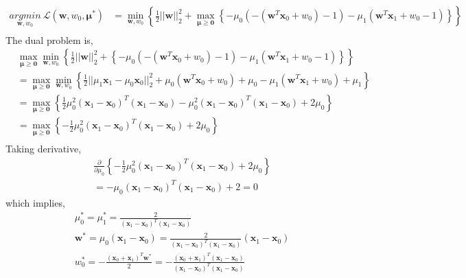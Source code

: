 \documentclass[11pt]{article}
\begin{document}
\begin{equation}
\begin{split}
\underset{\pmb{w},w_0}{argmin}\ \mathcal{L}(\pmb{w},w_0,\pmb{\mu}^*) &= \min_{\pmb{w}, w_0} \left\{\frac{1}{2}||\pmb{w}||^2_2 + \max_{\pmb{\mu}\ge\pmb{0}}\left\{- \mu_0(-(\pmb{w}^T\pmb{x}_0+w_0)-1) - \mu_1(\pmb{w}^T\pmb{x}_1+w_0-1)\right\}\right\}\\
\end{split}
\end{equation} 
The dual problem is,
\begin{equation}
\begin{split}
&\max_{\pmb{\mu}\ge\pmb{0}}\min_{\pmb{w}, w_0} \left\{\frac{1}{2}||\pmb{w}||^2_2 +\left\{- \mu_0(-(\pmb{w}^T\pmb{x}_0+w_0)-1) - \mu_1(\pmb{w}^T\pmb{x}_1+w_0-1)\right\}\right\}\\
&=\max_{\pmb{\mu}\ge\pmb{0}}\min_{\pmb{w}, w_0} \left\{\frac{1}{2}||\mu_1\pmb{x}_1-\mu_0\pmb{x}_0||^2_2+\mu_0(\pmb{w}^T\pmb{x}_0+w_0)+\mu_0 - \mu_1(\pmb{w}^T\pmb{x}_1+w_0)+\mu_1\right\}\\
&=\max_{\pmb{\mu}\ge\pmb{0}} \left\{\frac{1}{2}\mu_0^2(\pmb{x}_1-\pmb{x}_0)^T(\pmb{x}_1-\pmb{x}_0)-\mu_0^2(\pmb{x}_1-\pmb{x}_0)^T(\pmb{x}_1-\pmb{x}_0)+2\mu_0 \right\}\\
&=\max_{\pmb{\mu}\ge\pmb{0}} \left\{-\frac{1}{2}\mu_0^2(\pmb{x}_1-\pmb{x}_0)^T(\pmb{x}_1-\pmb{x}_0)+2\mu_0 \right\}\\
\end{split}
\end{equation}
Taking derivative,
\begin{equation}
\begin{split}
&\frac{\partial }{\partial \mu_0}\left\{-\frac{1}{2}\mu_0^2(\pmb{x}_1-\pmb{x}_0)^T(\pmb{x}_1-\pmb{x}_0)+2\mu_0 \right\}\\
&=-\mu_0(\pmb{x}_1-\pmb{x}_0)^T(\pmb{x}_1-\pmb{x}_0)+2 = 0 
\end{split}
\end{equation}
which implies,
\begin{equation}
\begin{split}
&\mu_0^* = \mu_1^* = \frac{2}{(\pmb{x}_1-\pmb{x}_0)^T(\pmb{x}_1-\pmb{x}_0)}\\
&\pmb{w}^* = \mu_0(\pmb{x}_1-\pmb{x}_0) = \frac{2}{(\pmb{x}_1-\pmb{x}_0)^T(\pmb{x}_1-\pmb{x}_0)} (\pmb{x}_1-\pmb{x}_0)\\
&w_0^* = -\frac{(\pmb{x}_0 + \pmb{x}_1)^T\pmb{w}^*}{2} = -\frac{(\pmb{x}_0 + \pmb{x}_1)^T(\pmb{x}_1-\pmb{x}_0)}{(\pmb{x}_1-\pmb{x}_0)^T(\pmb{x}_1-\pmb{x}_0)}
\end{split}
\end{equation}
\end{document}
